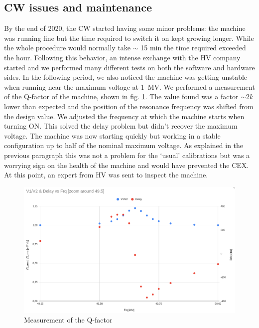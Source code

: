 \begin{refsection}
\section{CW issues and maintenance}
By the end of 2020, the CW started having some minor problems: the machine was running fine but the time required to switch it on kept growing longer. 
While the whole procedure would normally take $\sim$ 15 min the time required exceeded the hour.
Following this behavior, an intense exchange with the HV company started and we performed many different tests on both the software and hardware sides.
In the following period, we also noticed the machine was getting unstable when running near the maximum voltage at \SI{1}{MV}.
We performed a measurement of the Q-factor of the machine, shown in fig. \ref{fig:CW:Q-factor}. The value found was a factor $\sim2k$ lower than expected and the position of the resonance frequency was shifted from the design value.
We adjusted the frequency at which the machine starts when turning ON. 
This solved the delay problem but didn't recover the maximum voltage. 
The machine was now starting quickly but working in a stable configuration up to half of the nominal maximum voltage.
As explained in the previous paragraph this was not a problem for the `usual' calibrations but was a worrying sign on the health of the machine and would have prevented the CEX.
At this point, an expert from HV was sent to inspect the machine.

\begin{figure}
    \centering
    \includegraphics[width=1\textwidth]{Figures/MEG/CW/CW_Q-factor.png}
    \caption{Measurement of the Q-factor}
    \label{fig:CW:Q-factor}
\end{figure}


\end{refsection}
